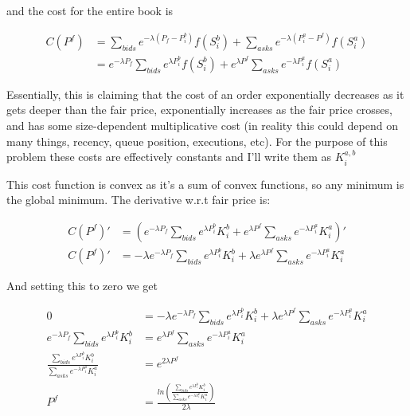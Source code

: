 \documentclass[]{article}
\begin{document}
and the cost for the entire book is

\begin{equation}
\begin{split}
	C(P^f) &= \sum_{bids} e^{-\lambda (P_f - P^b_i )} f(S^b_i) + \sum_{asks} e^{-\lambda (P^a_i - P^f )} f(S^a_i) \\
	   &= e^{-\lambda P_f}\sum_{bids}  e^{\lambda P^b_i} f(S^b_i) +e^{\lambda P^f }  \sum_{asks}  e^{-\lambda P^a_i} f(S^a_i)
\end{split}
\end{equation}

Essentially, this is claiming that the cost of an order exponentially decreases as it gets deeper than the fair price, exponentially increases as the fair price crosses, and has some size-dependent multiplicative cost (in reality this could depend on many things, recency, queue position, executions, etc). For the purpose of this problem these costs are effectively constants and I'll write them as $K^{a,b}_i$

This cost function is convex as it's a sum of convex functions, so any minimum is the global minimum. The derivative w.r.t fair price is:

\begin{equation}
\begin{split}
	C(P^f)' &= (e^{-\lambda P_f}\sum_{bids}  e^{\lambda P^b_i} K^b_i +e^{\lambda P^f }  \sum_{asks}  e^{-\lambda P^a_i} K^a_i)' \\
	C(P^f)' &= -\lambda e^{-\lambda P_f}\sum_{bids}  e^{\lambda P^b_i} K^b_i + \lambda e^{\lambda P^f }  \sum_{asks}  e^{-\lambda P^a_i} K^a_i
\end{split}
\end{equation}

And setting this to zero we get

\begin{equation}
	\begin{split}
		0 &= -\lambda e^{-\lambda P_f}\sum_{bids}  e^{\lambda P^b_i} K^b_i + \lambda e^{\lambda P^f }  \sum_{asks}  e^{-\lambda P^a_i} K^a_i \\
		e^{-\lambda P_f}\sum_{bids}  e^{\lambda P^b_i} K^b_i &=  e^{\lambda P^f }  \sum_{asks}  e^{-\lambda P^a_i} K^a_i \\
		\frac{\sum_{bids}  e^{\lambda P^b_i} K^b_i}{\sum_{asks}  e^{-\lambda P^a_i} K^a_i} &=  e^{2\lambda P^f } \\
			P^f &=	\frac{ln(\frac{\sum_{bids}  e^{\lambda P^b_i} K^b_i}{\sum_{asks}  e^{-\lambda P^a_i} K^a_i})}{2\lambda} \\
	\end{split}
\end{equation}
\end{document}
